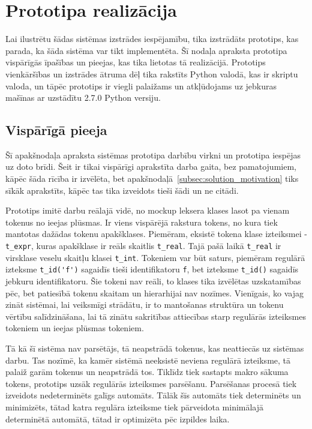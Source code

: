\section{Prototipa realizācija}
Lai ilustrētu šādas sistēmas izstrādes iespējamību, tika izstrādāts prototips, kas parada, ka šāda sistēma var tikt implementēta. Šī nodaļa apraksta prototipa vispārīgās īpašības un pieejas, kas tika lietotas tā realizācijā. Prototips vienkāršības un izstrādes ātruma dēļ tika rakstīts Python valodā, kas ir skriptu valoda, un tāpēc prototips ir viegli palaižams un atkļūdojams uz jebkuras mašīnas ar uzstādītu 2.7.0 Python versiju.

\subsection{Vispārīgā pieeja}
\label{subsec:solution_approach}
Šī apakšnodaļa apraksta sistēmas prototipa darbību virkni un prototipa iespējas uz doto brīdi. Šeit ir tikai vispārīgi aprakstīta darba gaita, bez pamatojumiem, kāpēc šāda rīcība ir izvēlēta, bet apakšnodaļā~\ref{subsec:solution_motivation} tiks sīkāk aprakstīts, kāpēc tas tika izveidots tieši šādi un ne citādi.

Prototips imitē darbu reālajā vidē, no mockup leksera klases lasot pa vienam tokenus no ieejas plūsmas. Ir viens vispārējā rakstura tokens, no kura tiek mantotas dažādas tokenu apakšklases. Piemēram, eksistē tokena klase izteiksmei - \verb|t_expr|, kuras apakšklase ir reāls skaitlis \verb|t_real|. Tajā pašā laikā \verb|t_real| ir virsklase veselu skaitļu klasei \verb|t_int|. Tokeniem var būt saturs, piemēram regulārā izteksme \verb|t_id('f')| sagaidīs tieši identifikatoru \verb|f|, bet izteksme \verb|t_id()| sagaidīs jebkuru identifikatoru. Šie tokeni nav reāli, to klases tika izvēlētas uzskatamības pēc, bet patiesībā tokenu skaitam un hierarhijai nav nozīmes. Vienīgais, ko vajag zināt sistēmai, lai veiksmīgi strādātu, ir to mantošanas struktūra un tokenu vērtību salīdzināšana, lai tā zinātu sakritības attiecības starp regulārās izteiksmes tokeniem un ieejas plūsmas tokeniem.

Tā kā šī sistēma nav parsētājs, tā neapstrādā tokenus, kas neattiecās uz sistēmas darbu. Tas nozīmē, ka kamēr sistēmā neeksistē neviena regulārā izteiksme, tā palaiž garām tokenus un neapstrādā tos. Tiklīdz tiek sastapts makro sākuma tokens, prototips uzsāk regulārās izteiksmes parsēšanu. Parsēšanas procesā tiek izveidots nedeterminēts galīgs automāts. Tālāk šīs automāts tiek determinēts un minimizēts, tātad katra regulāra izteiksme tiek pārveidota minimālajā determinētā automātā, tātad ir optimizēta pēc izpildes laika.

